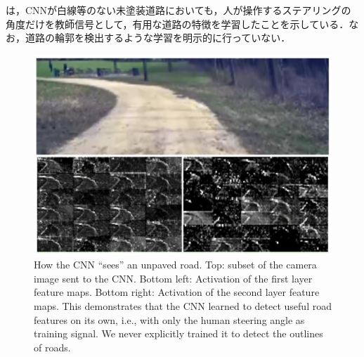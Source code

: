 \newpage

     は，CNNが白線等のない未塗装道路においても，人が操作するステアリングの角度だけを教師信号として，有用な道路の特徴を学習したことを示している．なお，道路の輪郭を検出するような学習を明示的に行っていない．

     \begin{figure}[h]
          \centering
          \includegraphics[keepaspectratio, scale=0.35] {images/bojarski_CNN.png}
          \captionsetup{justification=raggedright} %
          \caption{How the CNN ``sees'' an unpaved road. Top: subset of the camera image sent to the CNN. Bottom left: Activation of the first layer feature maps. Bottom right: Activation of the second layer feature maps. This demonstrates that the CNN learned to detect useful road features on its own, i.e., with only the human steering angle as training signal. We never explicitly trained it to detect the outlines of roads. \cite{bojarski}}
          \label{Fig:bojarski_CNN}
     \end{figure}

\newpage
